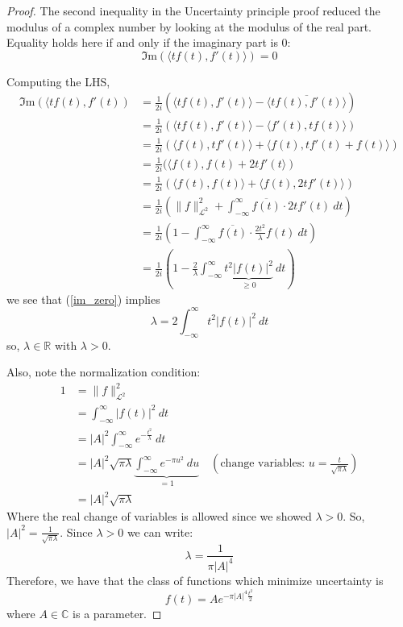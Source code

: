 \documentclass[12pt, reqno]{amsart}
\theoremstyle{definition}
\theoremstyle{remark}
\begin{document}
\begin{itemize}
\begin{proof}
    The second inequality in the Uncertainty principle proof reduced the modulus of a complex number by looking at the modulus of the real part. Equality holds here if and only if the imaginary part is 0:
    \begin{equation} \label{im_zero}
    \Im \text{m}(\langle t f(t),f'(t)\rangle)=0
    \end{equation}
    
    Computing the LHS,
    \begin{align*}
    \Im \text{m}(\langle tf(t),f'(t))&= \frac{1}{2i}(\langle tf(t),f'(t)\rangle-\overline{\langle tf(t),f'(t)\rangle})\\
    &= \frac{1}{2i}(\langle tf(t),f'(t)\rangle-\langle f'(t),tf(t)\rangle)\\
    &= \frac{1}{2i}(\langle f(t),tf'(t)\rangle+\langle f(t),tf'(t)+f(t)\rangle)\\
    &= \frac{1}{2i}(\langle f(t),f(t)+2tf'(t\rangle)\\
    &= \frac{1}{2i}(\langle f(t),f(t)\rangle+\langle f(t),2tf'(t)\rangle)\\
    &= \frac{1}{2i}\left(\|f\|_{\mathcal{L}^{2}}^{2}+\int_{-\infty}^{\infty}\overline{f(t)}\cdot2tf'(t)\ dt\right)\\
    &= \frac{1}{2i}\left(1-\int_{-\infty}^{\infty}\overline{f(t)}\cdot \frac{2t^{2}}{\lambda}f(t)\ dt\right)\\
    &= \frac{1}{2i}\left(1-\frac{2}{\lambda}\int_{-\infty}^{\infty} \underbrace{t^{2}|f(t)|^{2}}_{\ge0}\ dt\right)
    \end{align*}
    we see that (\ref{im_zero}) implies $$
    \lambda= 2\int_{-\infty}^{\infty}t^{2}|f(t)|^{2}\ dt
    $$so, $\lambda\in \mathbb{R}$ with $\lambda>0$. 
    
    Also, note the normalization condition: \begin{align*}
    1&= \|f\|_{\mathcal{L}^{2}}^{2}\\
    &= \int_{-\infty}^{\infty}|f(t)|^{2}\ dt\\
    &= |A|^{2}\int_{-\infty}^{\infty} e^{- \frac{t^{2}}{\lambda}}\ dt\\
    &= |A|^{2}\sqrt{\pi \lambda}\underbrace{\int_{-\infty}^{\infty} e^{-\pi u^{2}}\ du}_{=1}\quad(\text{change variables: }u= \frac{t}{\sqrt{\pi \lambda}})\\
    &= |A|^{2}\sqrt{\pi \lambda}
    \end{align*}
    Where the real change of variables is allowed since we showed $\lambda>0$. So, $|A|^{2}= \frac{1}{\sqrt{\pi \lambda}}$. Since $\lambda>0$ we can write: $$\lambda= \frac{1}{\pi|A|^{4}}$$ 
    Therefore, we have that the class of functions which minimize uncertainty is \begin{equation} \label{norm_gaus}
    f(t)=Ae^{-\pi|A|^{4} \frac{t^{2}}{2}}
    \end{equation}
    where $A\in \mathbb{C}$ is a parameter. 
    

\end{proof}
\end{itemize}
\end{document}
